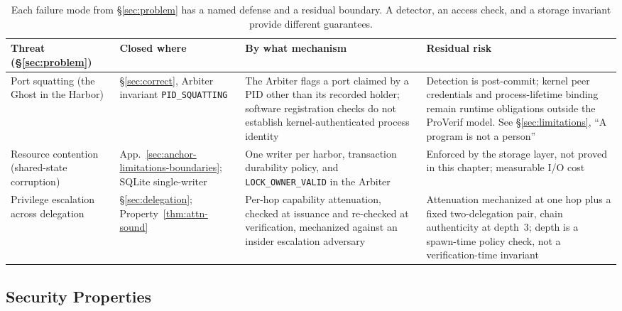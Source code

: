 \documentclass[11pt,a4paper]{article}
\theoremstyle{definition}
\begin{document}
\begin{table}[H]
\centering
\caption{Each failure mode from \S\ref{sec:problem} has a named defense and a residual boundary. A detector, an access check, and a storage invariant provide different guarantees.}
\label{tab:threat-closure}
\small
\begin{tabularx}{\textwidth}{@{}>{\raggedright\arraybackslash}p{} >{\raggedright\arraybackslash}p{} >{\raggedright\arraybackslash}X >{\raggedright\arraybackslash}X@{}}
\toprule
\textbf{Threat (\S\ref{sec:problem})} & \textbf{Closed where} & \textbf{By what mechanism} & \textbf{Residual risk} \\
\midrule
Port squatting (the Ghost in the Harbor) &
\S\ref{sec:correct}, Arbiter invariant \texttt{PID\allowbreak\_SQUATTING} &
The Arbiter flags a port claimed by a PID other than its recorded holder;
software registration checks do not establish kernel-authenticated process identity &
Detection is post-commit; kernel peer credentials and process-lifetime binding remain runtime obligations outside the ProVerif model. See \S\ref{sec:limitations}, ``A program is not a person'' \\
\addlinespace
Resource contention (shared-state corruption) &
App.~\ref{sec:anchor-limitations-boundaries}; SQLite single-writer &
One writer per harbor, transaction durability policy, and \texttt{LOCK\_OWNER\_VALID} in the Arbiter &
Enforced by the storage layer, not proved in this chapter; measurable I/O cost \\
\addlinespace
Privilege escalation across delegation &
\S\ref{sec:delegation}; Property~\ref{thm:attn-sound} &
Per-hop capability attenuation, checked at issuance and re-checked at verification, mechanized against an insider escalation adversary &
Attenuation mechanized at one hop plus a fixed two-delegation pair, chain authenticity at depth~3; depth is a spawn-time policy check, not a verification-time invariant \\
\bottomrule
\end{tabularx}
\end{table}

\ifdefined\pdbookfontprofile
\fi

\subsection{Security Properties}
\end{document}
